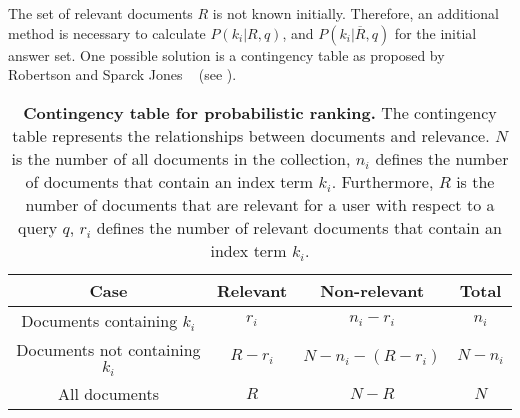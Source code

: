 The set of relevant documents $R$ is not known initially. Therefore, an additional method is necessary to calculate $P(k_i|R, q)$, and $P(k_i|\overline{R}, q)$ for the initial answer set. One possible solution is a contingency table as proposed by Robertson and Sparck Jones ~\cite{Robertson1976} (see ).

\begin{table}[b]
    \centering
    \begin{tabular}{ c c c c}
      \toprule
      \textbf{Case} & \textbf{Relevant} & \textbf{Non-relevant} & \textbf{Total} \\ \midrule
      Documents containing $k_i$ & $r_i$ & $n_i - r_i$ & $n_i$ \\
      Documents not containing $k_i$ & $R - r_i$ & $N - n_i - (R - r_i)$ & $N - n_i$ \\
      All documents & $R$ & $N - R$ & $N$ \\
      \bottomrule
    \end{tabular}
  \caption[Contingency table for probabilistic ranking]{\textbf{Contingency table for probabilistic ranking.} The contingency table represents the relationships between documents and relevance. $N$ is the number of all documents in the collection, $n_i$ defines the number of documents that contain an index term $k_i$. Furthermore, $R$ is the number of documents that are relevant for a user with respect to a query $q$, $r_i$ defines the number of relevant documents that contain an index term $k_i$.}
  \label{tbl:contingency_table_probabilistic_ranking}
\end{table}

